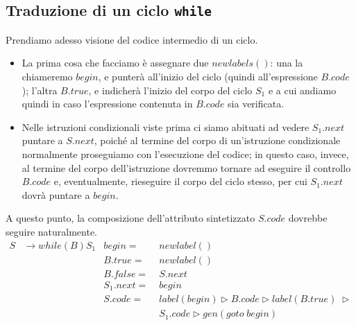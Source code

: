 \documentclass[class=book, crop=false, oneside, 12pt]{standalone}
\begin{document}
\subsection{Traduzione di un ciclo \texttt{while}}
Prendiamo adesso visione del codice intermedio di un ciclo. 
\begin{itemize}
    \item La prima cosa che facciamo è assegnare due \(newlabels()\): una la chiameremo \(begin\), e punterà all'inizio del ciclo (quindi all'espressione \(B.code\)); l'altra \(B.true\), e indicherà l'inizio del corpo del ciclo \(S_1\) e a cui andiamo quindi in caso l'espressione contenuta in \(B.code\) sia verificata.
    \item Nelle istruzioni condizionali viste prima ci siamo abituati ad vedere \(S_1.next\) puntare a \(S.next\), poiché al termine del corpo di un'istruzione condizionale normalmente proseguiamo con l'esecuzione del codice; in questo caso, invece, al termine del corpo dell'istruzione dovremmo tornare ad eseguire il controllo \(B.code\) e, eventualmente, rieseguire il corpo del ciclo stesso, per cui \(S_1.next\) dovrà puntare a \(begin\).
\end{itemize}
A questo punto, la composizione dell'attributo sintetizzato \(S.code\) dovrebbe seguire naturalmente.
\begin{align*}
    S &\to while (B) S_1 & begin =\; &newlabel() \\
    & & B.true =\; &newlabel() \\
    & & B.false =\; &S.next \\
    & & S_1.next =\; &begin \\
    & & S.code =\; &label(begin) \triangleright B.code \triangleright label(B.true)\; \triangleright \\
    & & &S_1.code \triangleright gen(goto\; begin)
\end{align*}
\end{document}

